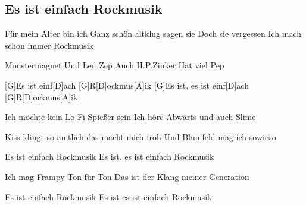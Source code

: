 \subsection*{Es ist einfach Rockmusik   }
\begin{guitar}

Für mein Alter bin ich
Ganz schön altklug sagen sie
Doch sie vergessen
Ich mach schon immer Rockmusik

 

Monstermagnet
Und Led Zep
Auch H.P.Zinker
Hat viel Pep

 

[G]Es ist einf[D]ach   [G]R[D]ockmus[A]ik 
[G]Es ist, es ist einf[D]ach   [G]R[D]ockmus[A]ik 

 

Ich möchte kein
Lo-Fi Spießer sein
Ich höre Abwärts
und auch Slime

 

Kiss klingt so amtlich
das macht mich froh
Und Blumfeld
mag ich sowieso

 

Es ist einfach Rockmusik 
Es ist. es ist einfach  Rockmusik

 

Ich mag Frampy
Ton für Ton
Das ist der Klang
meiner Generation

 

Es ist einfach Rockmusik 
Es ist es ist einfach  Rockmusik
\end{guitar}

